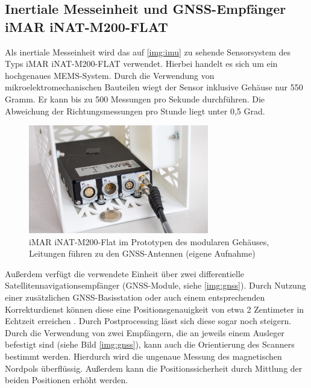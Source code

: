 \documentclass[a4paper,12pt,bibliography=totoc, listof=totoc,titlepage,pointlessnumbers]{scrreprt}
\begin{document}
\subsection{Inertiale Messeinheit und GNSS-Empfänger iMAR iNAT-M200-FLAT}
\label{s:iMar}
Als inertiale Messeinheit wird das auf \autoref{img:imu} zu sehende Sensorsystem des Typs iMAR iNAT-M200-FLAT verwendet. Hierbei handelt es sich um ein hochgenaues MEMS-System. Durch die Verwendung von mikroelektromechanischen Bauteilen wiegt der Sensor inklusive Gehäuse nur 550 Gramm. Er kann bis zu 500 Messungen pro Sekunde durchführen. Die Abweichung der Richtungsmessungen pro Stunde liegt unter 0,5 Grad. \citep{imar}

\begin{figure}
 \centering
 \includegraphics[width=0.7\textwidth]{./img/imu.jpg}
 \caption{iMAR iNAT-M200-Flat im Prototypen des modularen Gehäuses, Leitungen führen zu den GNSS-Antennen (eigene Aufnahme)}
 \label{img:imu}
\end{figure}

Außerdem verfügt die verwendete Einheit über zwei differentielle Satellitennavigationsempfänger (GNSS-Module, siehe \autoref{img:gnss}). Durch Nutzung einer zusätzlichen GNSS-Basisstation oder auch einem entsprechenden Korrekturdienst können diese eine Positionsgenauigkeit von etwa 2 Zentimeter in Echtzeit erreichen \citep{imar}. Durch Postprocessing lässt sich diese sogar noch steigern. \citet{wilken}  Durch die Verwendung von zwei Empfängern, die an jeweils einem Ausleger befestigt sind (siehe Bild \autoref{img:gnss}), kann auch die Orientierung des Scanners bestimmt werden. Hierdurch wird die ungenaue Messung des magnetischen Nordpols überflüssig. Außerdem kann die Positionssicherheit durch Mittlung der beiden Positionen erhöht werden.
\end{document}
